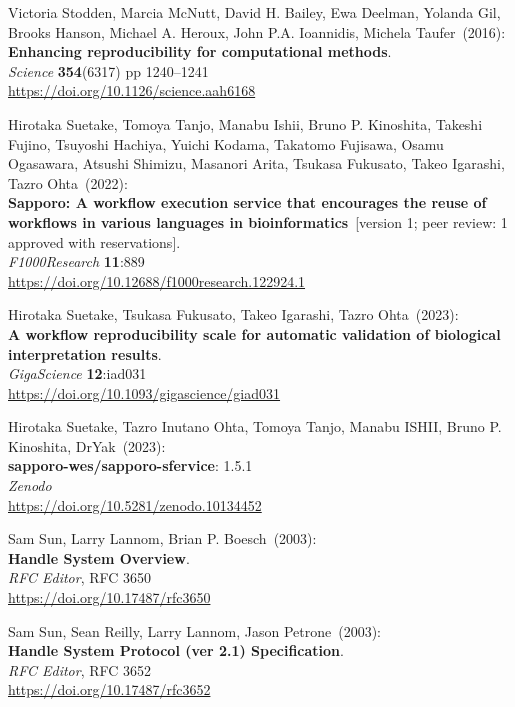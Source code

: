 \begin{thebibliography}{9}
Victoria Stodden, Marcia McNutt, David H. Bailey, Ewa Deelman,
Yolanda Gil, Brooks Hanson, Michael A. Heroux, John P.A. Ioannidis,
Michela Taufer~(2016): \\
\textbf{Enhancing reproducibility for computational methods}.\\
\emph{Science} \textbf{354}(6317) pp 1240--1241\\
\url{https://doi.org/10.1126/science.aah6168}

Hirotaka Suetake, Tomoya Tanjo, Manabu Ishii, Bruno
P. Kinoshita, Takeshi Fujino, Tsuyoshi Hachiya, Yuichi Kodama, Takatomo
Fujisawa, Osamu Ogasawara, Atsushi Shimizu, Masanori Arita, Tsukasa
Fukusato, Takeo Igarashi, Tazro Ohta~(2022): \\
\textbf{Sapporo: A workflow execution service that encourages the reuse
of workflows in various languages in bioinformatics}~[version 1; peer review: 1 approved with reservations].\\
\emph{F1000Research} \textbf{11}:889\\
\url{https://doi.org/10.12688/f1000research.122924.1}

Hirotaka Suetake, Tsukasa Fukusato, Takeo Igarashi, Tazro Ohta~(2023): \\
\textbf{A workflow reproducibility scale for automatic validation of biological interpretation results}.\\
\emph{GigaScience} \textbf{12}:iad031\\
\url{https://doi.org/10.1093/gigascience/giad031}

Hirotaka Suetake, Tazro Inutano Ohta, Tomoya Tanjo, Manabu ISHII, Bruno P. Kinoshita, DrYak~(2023): \\
\textbf{sapporo-wes/sapporo-sfervice}: 1.5.1\\
\emph{Zenodo}\\
\url{https://doi.org/10.5281/zenodo.10134452}


Sam Sun, Larry Lannom, Brian P. Boesch~(2003): \\
\textbf{Handle System Overview}.\\
\emph{RFC Editor}, RFC 3650\\
\url{https://doi.org/10.17487/rfc3650}

Sam Sun, Sean Reilly, Larry Lannom, Jason Petrone~(2003): \\
\textbf{Handle System Protocol (ver 2.1) Specification}.\\
\emph{RFC Editor}, RFC 3652\\
\url{https://doi.org/10.17487/rfc3652}


\end{thebibliography}
